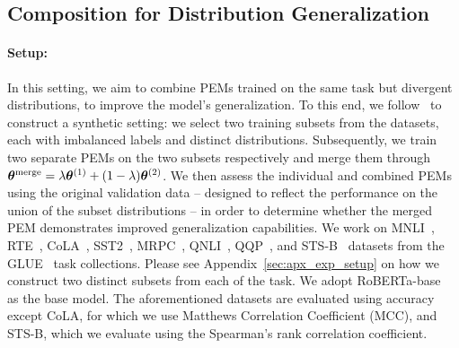 

\subsection{Composition for Distribution Generalization}
\label{sec:datasetsplit}

\paragraph{Setup:}
In this setting, we aim to combine PEMs trained on the same task but divergent distributions, to improve the model's generalization. 
To this end, we follow~\citet{jin2022dataless} to construct a synthetic setting: we select two training subsets from the datasets,
each with imbalanced labels and distinct distributions. Subsequently, we train two separate PEMs on the two subsets respectively and merge them through ${\bm{\theta}}^{\text{merge}} = \lambda{\bm{\theta}}^{(1)} + (1-\lambda){\bm{\theta}}^{(2)}$. 
We then assess the individual and combined PEMs using the original validation data -- designed to reflect the performance on the union of the subset distributions -- in order to determine whether the merged PEM demonstrates improved generalization capabilities.
We work on MNLI~\citep{williams2017broad}, RTE~\citep{giampiccolo2007third}, CoLA~\citep{warstadt2019cola}, SST2~\citep{socher2013recursive}, MRPC~\citep{dolan2005automatically}, QNLI~\citep{rajpurkar2016squad}, QQP~\citep{iyer2017first}, and STS-B~\citep{cer2017semeval} datasets from the GLUE~\citep{wang2018glue} task collections.
Please see Appendix~\ref{sec:apx_exp_setup} on how we construct two distinct subsets from each of the task. 
We adopt RoBERTa-base~\citep{liu2019roberta} as the base model.
The aforementioned datasets are evaluated using accuracy except CoLA, for which we use Matthews Correlation Coefficient (MCC), and STS-B, which we evaluate using the Spearman's rank correlation coefficient.

